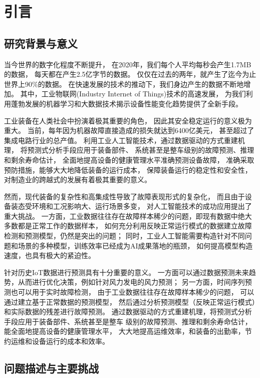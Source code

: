 ﻿%

\chapter{引言}\label{chapter1}

\section{研究背景与意义}
当今世界的数字化程度不断提升，
在2020年，我们每个人平均每秒会产生1.7MB的数据，
每天都在产生2.5亿字节的数据。
仅仅在过去的两年，就产生了迄今为止世界上90\%的数据\cite{siegel2013predictive}。
在快速发展的技术的推动下，我们身边产生的数据不断地增加。
其中，工业物联网(Industry Internet of Things)技术的高速发展，
为我们利用蓬勃发展的机器学习和大数据技术揭示设备性能变化趋势提供了全新手段。

工业装备在人类社会中扮演着极其重要的角色，
因此其安全稳定运行的意义极为重大。
当前，每年因为机器故障直接造成的损失就达到6400亿美元\cite{isa}，
甚至超过了集成电路行业的总产值。
利用工业人工智能技术，通过数据驱动的方式重建机理，
将预测式分析手段应用于装备部件、
系统甚至是整车级别的故障预测、推理和剩余寿命估计，
全面地提高设备的健康管理水平准确预测设备故障，
准确采取预防措施，能够大大地降低装备的运行成本，
保障装备运行的稳定性和安全性，
对制造业的跨越式的发展有着极其重要的意义。


然而，现代装备的复杂性和高集成性导致了故障表现形式的复杂化，
而且由于设备装态受环境和工况影响大、运行场景多变，
对人工智能技术的成功应用提出了重大挑战。
一方面，工业数据往往存在故障样本稀少的问题，即现有数据中绝大多数都是正常工作的数据样本，
如何充分利用反映正常运行模式的数据建立故障检测和预测模型，仍然是突出的问题；
同时，工业人工智能需要构造针对不同问题和场景的多种模型，训练效率已经成为AI成果落地的瓶颈，
如何提高模型构造速度，也具有极大的紧迫性。


针对历史IoT数据进行预测具有十分重要的意义。
一方面可以通过数据预测未来趋势，从而进行优化决策，例如针对风力发电的风力预测；
另一方面，时间序列预测也可以用于实时故障检测，
由于工业数据往往存在故障样本稀少的问题，
可以通过建立基于正常数据的预测模型，
然后通过分析预测模型（反映正常运行模式）和实际数据的残差进行故障预测。
通过数据驱动的方式重建机理，将预测式分析手段应用于装备部件、系统甚至是整车
级别的故障预测、推理和剩余寿命估计，能全面地提高设备的健康管理水平，
大大地提高运维效率，和装备的出勤率，节约运维和设备运行的成本和效率。

\section{问题描述与主要挑战}
